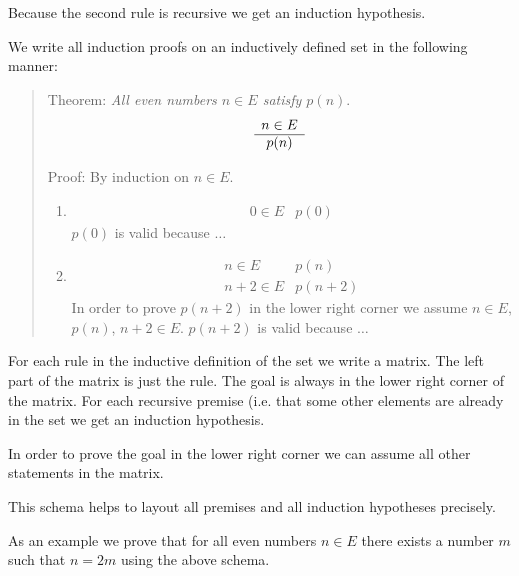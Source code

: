 Because the second rule is recursive we get an induction hypothesis.

We write all induction proofs on an inductively defined set in the following
manner:

\begin{quote}
    Theorem: \emph{All even numbers $n \in E$ satisfy $p(n)$}.
    $$
    \begin{array}{c} n \in E \\ \hline p(n)\end{array}
    $$

    Proof: By induction on $n \in E$.
    \begin{enumerate}
    \item
        $$
        \begin{array}{l|l}
        0 \in E
        & p(0)
        \end{array}
        $$
        $p(0)$ is valid because $\ldots$

    \item
        $$
        \begin{array}{l|l}
            n \in E
            &
            p(n)
            \\
            \hline
            n+2 \in E
            &
            p(n+2)
        \end{array}
        $$
        In order to prove $p(n+2)$ in the lower right corner we assume $n \in
        E$, $p(n)$, $n+2 \in E$. $p(n+2)$ is valid because $\ldots$
    \end{enumerate}
\end{quote}

For each rule in the inductive definition of the set we write a matrix. The left
part of the matrix is just the rule. The goal is always in the lower right corner
of the matrix. For each recursive premise (i.e. that some other elements are
already in the set we get an induction hypothesis.

In order to prove the goal in the lower right corner we can assume all other
statements in the matrix.

This schema helps to layout all premises and all induction hypotheses precisely.

As an example we prove that for all even numbers $n \in E$ there exists a number
$m$ such that $n = 2m$ using the above schema.

